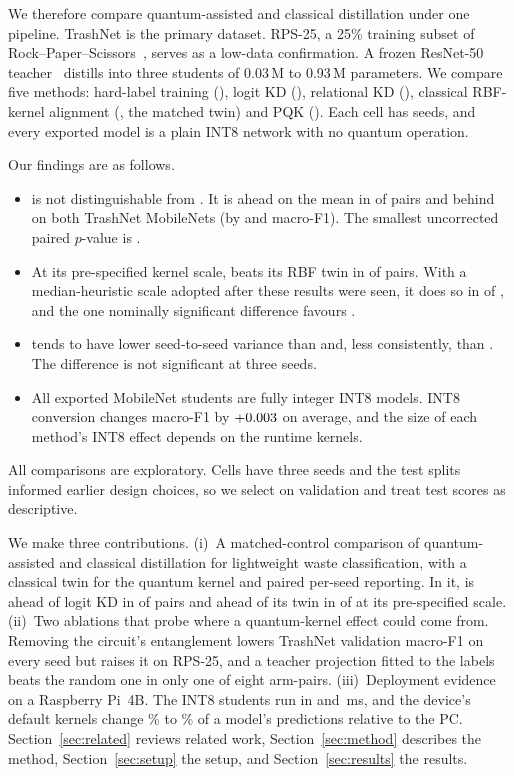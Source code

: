 We therefore compare quantum-assisted and classical distillation under one pipeline.
TrashNet is the primary dataset. RPS-25, a 25\% training subset of Rock--Paper--Scissors~\citep{moroney2019rps}, serves as a low-data confirmation.
A frozen ResNet-50 teacher~\citep{he2016deep} distills into three students of 0.03\,M to 0.93\,M parameters. We compare five methods: hard-label training (\Scratch), logit KD (\Kd), relational KD (\Rkd), classical RBF-kernel alignment (\Rbf, the matched twin) and PQK (\Pqk).
Each cell has \NSeeds{} seeds, and every exported model is a plain INT8 network with no quantum operation.

Our findings are as follows.
\begin{itemize}
  \item \Pqk is not distinguishable from \Kd. It is ahead on the mean in \KdAheadFp{} of \NPairs{} pairs and behind on both TrashNet MobileNets (by \KdBehindTnA{} and \KdBehindTnB{} macro-F1). The smallest uncorrected paired $p$-value is \MinPKd{}.
  \item At its pre-specified kernel scale, \Pqk beats its RBF twin in \GtwoFixedWins{} of \NPairs{} pairs. With a median-heuristic scale adopted after these results were seen, it does so in \GtwoAdaptWins{} of \GtwoAdaptPairs{}, and the one nominally significant difference favours \MinPRbfAdaptFavours.
  \item \Pqk tends to have lower seed-to-seed variance than \Rbf and, less consistently, than \Scratch. The difference is not significant at three seeds.
  \item All \NIntModels{} exported MobileNet students are fully integer INT8 models. INT8 conversion changes macro-F1 by $+0.003$ on average, and the size of each method's INT8 effect depends on the runtime kernels.
\end{itemize}
All comparisons are exploratory. Cells have three seeds and the test splits informed earlier design choices, so we select on validation and treat test scores as descriptive.

We make three contributions.
(i)~A matched-control comparison of quantum-assisted and classical distillation for lightweight waste classification, with a classical twin for the quantum kernel and paired per-seed reporting. In it, \Pqk is ahead of logit KD in \KdAheadFp{} of \NPairs{} pairs and ahead of its twin in \GtwoFixedWins{} of \NPairs{} at its pre-specified scale.
(ii)~Two ablations that probe where a quantum-kernel effect could come from. Removing the circuit's entanglement lowers TrashNet validation macro-F1 on every seed but raises it on RPS-25, and a teacher projection fitted to the labels beats the random one in only one of eight arm-pairs.
(iii)~Deployment evidence on a Raspberry Pi~4B. The INT8 students run in \LatMnvTwo{} and \LatMnvThree{}\,ms, and the device's default kernels change \XnnDisMin{}\% to \XnnDisMax{}\% of a model's predictions relative to the PC.
Section~\ref{sec:related} reviews related work, Section~\ref{sec:method} describes the method, Section~\ref{sec:setup} the setup, and Section~\ref{sec:results} the results.
